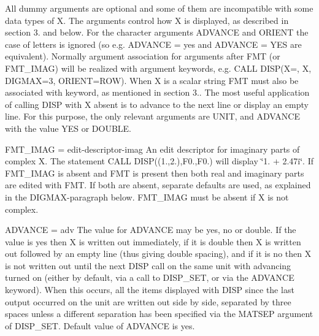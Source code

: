 All dummy arguments are optional and some of them are incompatible with some data types of X. The arguments control how X is displayed, as described in section 3. and below. For the character arguments A\+D\+V\+A\+N\+CE and O\+R\+I\+E\+NT the case of letters is ignored (so e.\+g. A\+D\+V\+A\+N\+CE = \textquotesingle{}yes\textquotesingle{} and A\+D\+V\+A\+N\+CE = \textquotesingle{}Y\+ES\textquotesingle{} are equivalent). Normally argument association for arguments after F\+MT (or F\+M\+T\+\_\+\+I\+M\+AG) will be realized with argument keywords, e.\+g. C\+A\+LL D\+I\+SP(\textquotesingle{}X=\textquotesingle{}, X, D\+I\+G\+M\+AX=3, O\+R\+I\+E\+NT=\textquotesingle{}R\+OW\textquotesingle{}). When X is a scalar string F\+MT must also be associated with keyword, as mentioned in section 3.. The most useful application of calling D\+I\+SP with X absent is to advance to the next line or display an empty line. For this purpose, the only relevant arguments are U\+N\+IT, and A\+D\+V\+A\+N\+CE with the value \textquotesingle{}Y\+ES\textquotesingle{} or \textquotesingle{}D\+O\+U\+B\+LE\textquotesingle{}.

F\+M\+T\+\_\+\+I\+M\+AG = edit-\/descriptor-\/imag An edit descriptor for imaginary parts of complex X. The statement C\+A\+LL D\+I\+SP((1.,2.),\textquotesingle{}F0.\textquotesingle{},\textquotesingle{}F0.\textquotesingle{}) will display \char`\"{}1. + 2.\+47i\char`\"{}. If F\+M\+T\+\_\+\+I\+M\+AG is absent and F\+MT is present then both real and imaginary parts are edited with F\+MT. If both are absent, separate defaults are used, as explained in the D\+I\+G\+M\+A\+X-\/paragraph below. F\+M\+T\+\_\+\+I\+M\+AG must be absent if X is not complex.

A\+D\+V\+A\+N\+CE = adv The value for A\+D\+V\+A\+N\+CE may be \textquotesingle{}yes\textquotesingle{}, \textquotesingle{}no\textquotesingle{} or \textquotesingle{}double\textquotesingle{}. If the value is \textquotesingle{}yes\textquotesingle{} then X is written out immediately, if it is \textquotesingle{}double\textquotesingle{} then X is written out followed by an empty line (thus giving double spacing), and if it is \textquotesingle{}no\textquotesingle{} then X is not written out until the next D\+I\+SP call on the same unit with advancing turned on (either by default, via a call to D\+I\+S\+P\+\_\+\+S\+ET, or via the A\+D\+V\+A\+N\+CE keyword). When this occurs, all the items displayed with D\+I\+SP since the last output occurred on the unit are written out side by side, separated by three spaces unless a different separation has been specified via the M\+A\+T\+S\+EP argument of D\+I\+S\+P\+\_\+\+S\+ET. Default value of A\+D\+V\+A\+N\+CE is \textquotesingle{}yes\textquotesingle{}.

